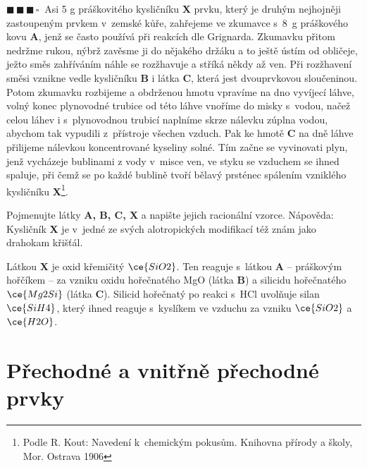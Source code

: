 \documentclass{book}
\newcommand{\tri}{$\blacksquare \, \blacksquare \, \blacksquare \, \square \; \; $}
\renewenvironment{quotation}{\par}{\par} %
\begin{document}
\hrulefill %
\begin{quotation}
\tri Asi 5 g práškovitého kysličníku \textbf{X} prvku, který je druhým
nejhojněji zastoupeným prvkem v~zemské kůře, zahřejeme ve zkumavce
s~8~g práškového kovu \textbf{A}, jenž se často používá při reakcích
dle Grignarda. Zkumavku přitom nedržme rukou, nýbrž zavěsme ji do
nějakého držáku a to ještě ústím od obličeje, ježto směs zahříváním
náhle se rozžhavuje a stříká někdy až ven. Při rozžhavení směsi vznikne
vedle kysličníku \textbf{B} i látka \textbf{C}, která jest dvouprvkovou
sloučeninou. Potom zkumavku rozbijeme a obdrženou hmotu vpravíme na
dno vyvíjecí láhve, volný konec plynovodné trubice od této láhve vnoříme
do misky s~vodou, načež celou láhev i s~plynovodnou trubicí naplníme
skrze nálevku zúplna vodou, abychom tak vypudili z~přístroje všechen
vzduch. Pak ke hmotě \textbf{C} na dně láhve přilijeme nálevkou koncentrované
kyseliny solné. Tím začne se vyvinovati plyn, jenž vycházeje bublinami
z vody v~misce ven, ve styku se vzduchem se ihned spaluje, při čemž
se po každé bublině tvoří bělavý prsténec spálením vzniklého kysličníku
\textbf{X}\footnote{Podle R. Kout: Navedení k~chemickým pokusům. Knihovna přírody a školy, Mor. Ostrava 1906}.

Pojmenujte látky \textbf{A, B, C, X} a napište jejich racionální vzorce.
Nápověda: Kysličník \textbf{X} je v~jedné ze svých alotropických modifikací
též znám jako drahokam křišťál.
\end{quotation} \dotfill \par 
Látkou \textbf{X} je oxid křemičitý $\ce{SiO2}$. Ten reaguje s~látkou
\textbf{A} -- práškovým hořčíkem -- za vzniku oxidu hořečnatého MgO
(látka \textbf{B}) a silicidu hořečnatého $\ce{Mg2Si}$ (látka \textbf{C}). Silicid
hořečnatý po reakci s~HCl uvolňuje silan $\ce{SiH4}$, který ihned
reaguje s~kyslíkem ve vzduchu za vzniku $\ce{SiO2}$ a $\ce{H2O}$.

\newpage %
\section{Přechodné a vnitřně přechodné prvky}
\end{document}
